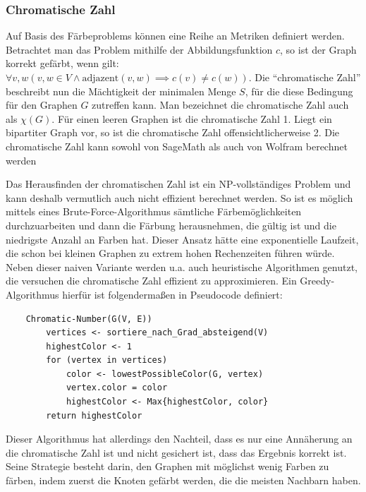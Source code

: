 \documentclass[a4paper,12pt,ngerman,chapterprefix=false,listof=totoc,bibliography=totoc]{scrreprt}
\begin{document}
\subsubsection*{Chromatische Zahl}
{
Auf Basis des Färbeproblems können eine Reihe an Metriken definiert werden. Betrachtet man das Problem mithilfe der Abbildungsfunktion \(c\), so ist der Graph korrekt gefärbt, wenn gilt: \(\forall v, w (v,w\in V \land \text{adjazent}(v, w)\implies c(v)\neq c(w))\). Die "`chromatische Zahl"' beschreibt nun die Mächtigkeit der minimalen Menge \(S\), für die diese Bedingung für den Graphen \(G\) zutreffen kann. Man bezeichnet die chromatische Zahl auch als \(\chi (G)\). Für einen leeren Graphen ist die chromatische Zahl 1. Liegt ein bipartiter Graph vor, so ist die chromatische Zahl offensichtlicherweise 2. \cite{diestel_graphentheorie_2000} Die chromatische Zahl kann sowohl von SageMath als auch von Wolfram berechnet werden \cite{sagemath_graph_2020-1,wolfram_wolfram_2020-1}

Das Herausfinden der chromatischen Zahl ist ein NP-vollständiges Problem und kann deshalb vermutlich auch nicht effizient berechnet werden. \cite{weisstein_chromatic_nodate,karp_reducibility_1996} So ist es möglich mittels eines Brute-Force-Algorithmus sämtliche Färbemöglichkeiten durchzuarbeiten und dann die Färbung herausnehmen, die gültig ist und die niedrigste Anzahl an Farben hat. Dieser Ansatz hätte eine exponentielle Laufzeit, die schon bei kleinen Graphen zu extrem hohen Rechenzeiten führen würde. Neben dieser naiven Variante werden u.a. auch heuristische Algorithmen genutzt, die versuchen die chromatische Zahl effizient zu approximieren. Ein Greedy-Algorithmus hierfür ist folgendermaßen in Pseudocode definiert:
\begin{lstlisting}
	Chromatic-Number(G(V, E))
		vertices <- sortiere_nach_Grad_absteigend(V)
		highestColor <- 1
		for (vertex in vertices)
			color <- lowestPossibleColor(G, vertex)
			vertex.color = color
			highestColor <- Max{highestColor, color}
		return highestColor
\end{lstlisting}
Dieser Algorithmus hat allerdings den Nachteil, dass es nur eine Annäherung an die chromatische Zahl ist und nicht gesichert ist, dass das Ergebnis korrekt ist. Seine Strategie besteht darin, den Graphen mit möglichst wenig Farben zu färben, indem zuerst die Knoten gefärbt werden, die die meisten Nachbarn haben. 
}
\end{document}
